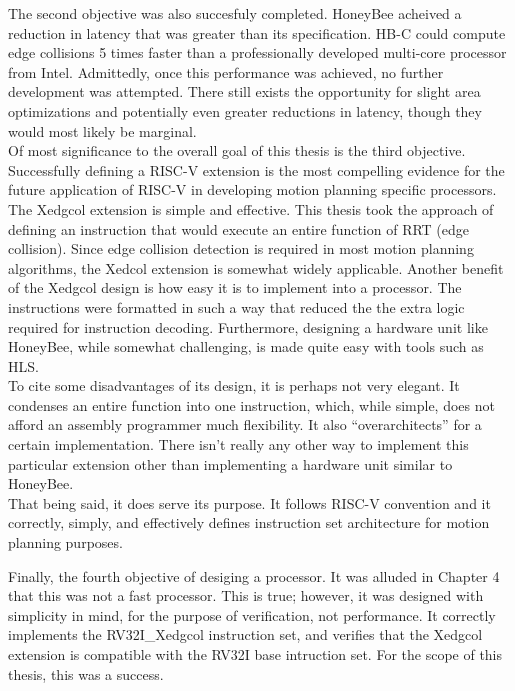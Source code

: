     The second objective was also succesfuly completed. HoneyBee acheived a reduction in latency that was greater than its specification. HB-C could compute edge collisions 5 times faster than a professionally developed multi-core processor from Intel. Admittedly, once this performance was achieved, no further development was attempted. There still exists the opportunity for slight area optimizations and potentially even greater reductions in latency, though they would most likely be marginal. \\

    Of most significance to the overall goal of this thesis is the third objective. Successfully defining a RISC-V extension is the most compelling evidence for the future application of RISC-V in developing motion planning specific processors. \\
    The Xedgcol extension is simple and effective. This thesis took the approach of defining an instruction that would execute an entire function of RRT (edge collision). Since edge collision detection is required in most motion planning algorithms, the Xedcol extension is somewhat widely applicable. Another benefit of the Xedgcol design is how easy it is to implement into a processor. The instructions were formatted in such a way that reduced the the extra logic required for instruction decoding. Furthermore, designing a hardware unit like HoneyBee, while somewhat challenging, is made quite easy with tools such as \gls{HLS}. \\
    To cite some disadvantages of its design, it is perhaps not very elegant. It condenses an entire function into one instruction, which, while simple, does not afford an assembly programmer much flexibility. It also ``overarchitects'' for a certain implementation. There isn't really any other way to implement this particular extension other than implementing a hardware unit similar to HoneyBee. \\
    That being said, it does serve its purpose. It follows RISC-V convention and it correctly, simply, and effectively defines instruction set architecture for motion planning purposes.

    Finally, the fourth objective of desiging a processor. It was alluded in Chapter 4 that this was not a fast processor. This is true; however, it was designed with simplicity in mind, for the purpose of verification, not performance. It correctly implements the RV32I\_Xedgcol instruction set, and verifies that the Xedgcol extension is compatible with the RV32I base intruction set. For the scope of this thesis, this was a success.

